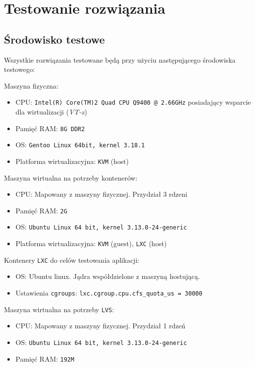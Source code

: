 \chapter{Testowanie rozwiązania}
\section{Środowisko testowe}
Wszystkie rozwiązania testowane będą przy użyciu następującego środowiska testowego:
\begin{description}
\item{Maszyna fizyczna:}
    \begin{itemize}
	\item CPU: \texttt{Intel(R) Core(TM)2 Quad CPU    Q9400  @ 2.66GHz} posiadający wsparcie dla wirtualizacji (\textit{VT-x})
	\item Pamięć RAM: \texttt{8G DDR2}
	\item OS: \texttt{Gentoo Linux 64bit, kernel 3.18.1}
	\item Platforma wirtualizacyjna: \texttt{KVM} (host)
    \end{itemize}
\item{Maszyna wirtualna na potrzeby kontenerów:}
    \begin{itemize}
	\item CPU: Mapowany z maszyny fizycznej. Przydział 3 rdzeni
	\item Pamięć RAM: \texttt{2G}
	\item OS: \texttt{Ubuntu Linux 64 bit, kernel 3.13.0-24-generic}
	\item Platforma wirtualizacyjna: \texttt{KVM} (guest), \texttt{LXC} (host)
    \end{itemize}
\item{Kontenery \texttt{LXC} do celów testowania aplikacji:}
    \begin{itemize}
	\item OS: Ubuntu linux. Jądra współdzielone z maszyną hostującą.
	\item Ustawienia \texttt{cgroups}: \texttt{lxc.cgroup.cpu.cfs\_quota\_us = 30000}
    \end{itemize}
\item{Maszyna wirtualna na potrzeby \texttt{LVS}:}
    \begin{itemize}
	\item CPU: Mapowany z maszyny fizycznej. Przydział 1 rdzeń
	\item OS: \texttt{Ubuntu Linux 64 bit, kernel 3.13.0-24-generic}
	\item Pamięć RAM: \texttt{192M}
    \end{itemize}
\end{description}
